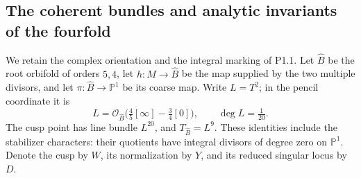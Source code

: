 \subsection{The coherent bundles and analytic invariants of the fourfold}

We retain the complex orientation and the integral marking of P1.1.
Let $\widehat B$ be the root orbifold of orders $5,4$, let
$h:M\to\widehat B$ be the map supplied by the two multiple divisors,
and let $\pi:\widehat B\to\mathbb P^1$ be its coarse map.
Write $L=T^2$; in the pencil coordinate it is
\[
 L=\mathcal O_{\widehat B}\bigl(\tfrac45[\infty]
                  -\tfrac34[0]\bigr),\qquad \deg L=\tfrac1{20}.
\]
The cusp point has line bundle $L^{20}$, and
$T_{\widehat B}=L^9$. These identities include the stabilizer
characters: their quotients have integral divisors of degree zero
on $\mathbb P^1$. Denote the cusp by $W$, its normalization by $Y$,
and its reduced singular locus by $D$.

